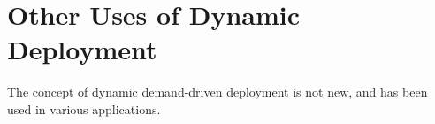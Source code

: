 \section{Other Uses of Dynamic Deployment}
The concept of dynamic demand-driven deployment is not new,
and has been used in various applications.